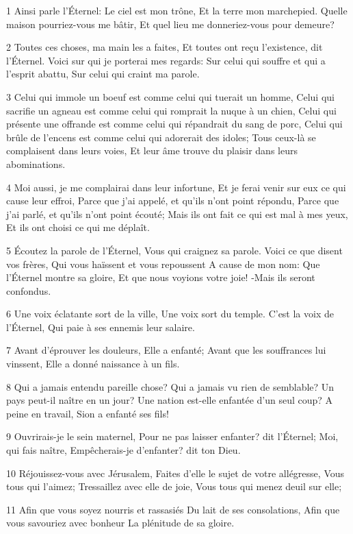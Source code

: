 \par 1 Ainsi parle l'Éternel: Le ciel est mon trône, Et la terre mon marchepied. Quelle maison pourriez-vous me bâtir, Et quel lieu me donneriez-vous pour demeure?
\par 2 Toutes ces choses, ma main les a faites, Et toutes ont reçu l'existence, dit l'Éternel. Voici sur qui je porterai mes regards: Sur celui qui souffre et qui a l'esprit abattu, Sur celui qui craint ma parole.
\par 3 Celui qui immole un boeuf est comme celui qui tuerait un homme, Celui qui sacrifie un agneau est comme celui qui romprait la nuque à un chien, Celui qui présente une offrande est comme celui qui répandrait du sang de porc, Celui qui brûle de l'encens est comme celui qui adorerait des idoles; Tous ceux-là se complaisent dans leurs voies, Et leur âme trouve du plaisir dans leurs abominations.
\par 4 Moi aussi, je me complairai dans leur infortune, Et je ferai venir sur eux ce qui cause leur effroi, Parce que j'ai appelé, et qu'ils n'ont point répondu, Parce que j'ai parlé, et qu'ils n'ont point écouté; Mais ils ont fait ce qui est mal à mes yeux, Et ils ont choisi ce qui me déplaît.
\par 5 Écoutez la parole de l'Éternel, Vous qui craignez sa parole. Voici ce que disent vos frères, Qui vous haïssent et vous repoussent A cause de mon nom: Que l'Éternel montre sa gloire, Et que nous voyions votre joie! -Mais ils seront confondus.
\par 6 Une voix éclatante sort de la ville, Une voix sort du temple. C'est la voix de l'Éternel, Qui paie à ses ennemis leur salaire.
\par 7 Avant d'éprouver les douleurs, Elle a enfanté; Avant que les souffrances lui vinssent, Elle a donné naissance à un fils.
\par 8 Qui a jamais entendu pareille chose? Qui a jamais vu rien de semblable? Un pays peut-il naître en un jour? Une nation est-elle enfantée d'un seul coup? A peine en travail, Sion a enfanté ses fils!
\par 9 Ouvrirais-je le sein maternel, Pour ne pas laisser enfanter? dit l'Éternel; Moi, qui fais naître, Empêcherais-je d'enfanter? dit ton Dieu.
\par 10 Réjouissez-vous avec Jérusalem, Faites d'elle le sujet de votre allégresse, Vous tous qui l'aimez; Tressaillez avec elle de joie, Vous tous qui menez deuil sur elle;
\par 11 Afin que vous soyez nourris et rassasiés Du lait de ses consolations, Afin que vous savouriez avec bonheur La plénitude de sa gloire.
